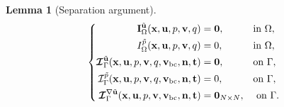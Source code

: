 \documentclass[oneside,11pt]{book}
\numberwithin{equation}{section}
\newtheorem{lemma}{Lemma}[section]
\begin{document}
\begin{enumerate}[leftmargin=0mm]
\begin{itemize}[leftmargin=0in]
\begin{lemma}[Separation argument]
\begin{equation}
                \label{separation argument/general stationary Stokes/case 1.2/2}
                \left\{\begin{split}
                    {\bf I}_\Omega^{\tilde{\bf u}}({\bf x},{\bf u},p,{\bf v},q) &= {\bf 0},&&\mbox{in }\Omega,\\
                    I_\Omega^{\tilde{p}}({\bf x},{\bf u},p,{\bf v},q) &= 0,&&\mbox{in }\Omega,\\
                    \boldsymbol{\mathcal{I}}_\Gamma^{\tilde{\bf u}}({\bf x},{\bf u},p,{\bf v},q,{\bf v}_{\rm bc},{\bf n},{\bf t}) &= {\bf 0},&&\mbox{on }\Gamma,\\
                    \mathcal{I}_\Gamma^{\tilde{p}}({\bf x},{\bf u},p,{\bf v},q,{\bf v}_{\rm bc},{\bf n},{\bf t}) &= 0,&&\mbox{on }\Gamma,\\
                    \boldsymbol{\mathcal{I}}_\Gamma^{\nabla\tilde{\bf u}}({\bf x},{\bf u},p,{\bf v},{\bf v}_{\rm bc},{\bf n},{\bf t}) &= {\bf 0}_{N\times N},&&\mbox{ on }\Gamma.
                \end{split}\right.
            \end{equation}
        \end{lemma}
        

\end{itemize}
\end{enumerate}
\end{document}

